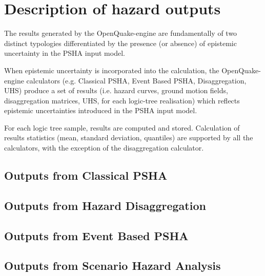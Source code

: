 \section{Description of hazard outputs}
\label{sec:hazard_outputs}

The results generated by the OpenQuake-engine are fundamentally of two
distinct typologies differentiated by the presence (or absence) of epistemic
uncertainty in the PSHA input model.

When epistemic uncertainty is incorporated into the calculation, the
OpenQuake-engine calculators (e.g. Classical PSHA, Event Based PSHA,
Disaggregation, UHS) produce a set of results (i.e. hazard curves, ground
motion fields, disaggregation matrices, UHS, for each logic-tree realisation)
which reflects epistemic uncertainties introduced in the PSHA input model.

For each logic tree sample, results are computed and stored. Calculation of
results statistics (mean, standard deviation, quantiles) are supported by all
the calculators, with the exception of the disaggregation calculator.

\subsection{Outputs from Classical PSHA}
\label{subsec:output_classical_psha}


\subsection{Outputs from Hazard Disaggregation}
\label{subsec:output_hazard_disaggregation}


\subsection{Outputs from Event Based PSHA}
\label{subsec:output_event_based_psha}


\subsection{Outputs from Scenario Hazard Analysis}
\label{subsec:output_scenario_hazard}

